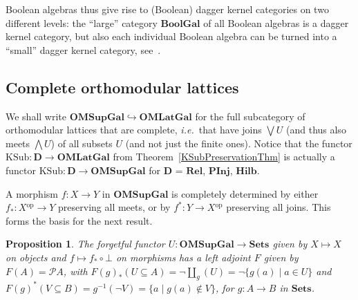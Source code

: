 \documentclass{article}
\newtheorem{proposition}[theorem]{Proposition}
\newcommand{\after}{\mathrel{\circ}}
\newcommand{\Cat}[1]{\ensuremath{\mathbf{#1}}}
\newcommand{\op}{\ensuremath{^{\mathrm{op}}}}
\newcommand{\KSub}{\ensuremath{\mathrm{KSub}}}
\newcommand{\powerset}{\mathcal{P}}
\newcommand{\Rel}{\Cat{Rel}\xspace}
\newcommand{\PInj}{\Cat{PInj}\xspace}
\newcommand{\Hilb}{\Cat{Hilb}\xspace}
\newcommand{\Sets}{\Cat{Sets}\xspace}
\newcommand{\set}[2]{\{#1\;|\;#2\}}
\begin{document}
Boolean algebras thus give rise to (Boolean) dagger kernel categories
on two different levels: the ``large'' category \Cat{BoolGal} of all
Boolean algebras is a dagger kernel category, but also each individual
Boolean algebra can be turned into a ``small'' dagger kernel category,
see~\cite[Proposition~3.5]{HeunenJ09a}.



\subsection{Complete orthomodular lattices}\label{CompleteSubsec}

We shall write $\Cat{OMSupGal}\hookrightarrow \Cat{OMLatGal}$ for the
full subcategory of orthomodular lattices that are complete,
\textit{i.e.}~that have joins $\bigvee U$ (and thus also meets
$\bigwedge U$) of all subsets $U$ (and not just the finite ones).
Notice that the functor $\KSub\colon \Cat{D} \rightarrow
\Cat{OMLatGal}$ from Theorem~\ref{KSubPreservationThm} is actually a
functor $\KSub\colon \Cat{D} \rightarrow \Cat{OMSupGal}$ for \Cat{D} =
\Rel, \PInj, \Hilb.

A morphism $f\colon X\rightarrow Y$ in \Cat{OMSupGal} is completely
determined by either $f_{*}\colon X\op \rightarrow Y$ preserving all
meets, or by $f^{*}\colon Y\rightarrow X\op$ preserving all
joins. This forms the basis for the next result.


\begin{proposition}
\label{FreeOMLatGalProp}
The forgetful functor $U\colon \Cat{OMSupGal} \to \Sets$ given by
$X\mapsto X$ on objects and $f\mapsto f_{*} \after \bot$ on morphisms
has a left adjoint $F$ given by $F(A) = \powerset{A}$, with
$F(g)_{*}(U \subseteq A) = \neg\coprod_{g}(U) = \neg\set{g(a)}{a\in
  U}$ and $F(g)^{*}(V\subseteq B) = g^{-1}(\neg V) =
\set{a}{g(a)\not\in V}$, for $g\colon A\rightarrow B$ in $\Sets$.
\end{proposition}
\end{document}
